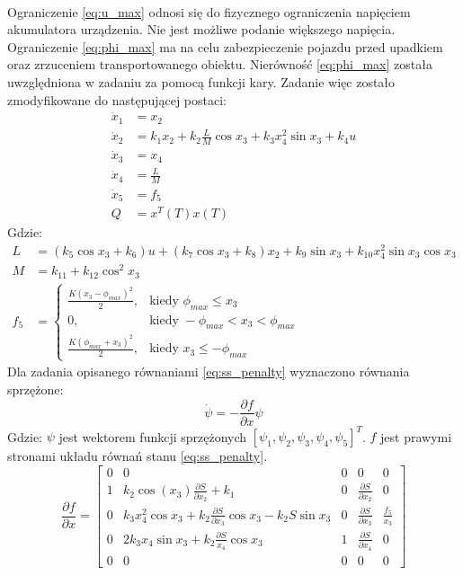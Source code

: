\paragraph*{}
Ograniczenie \eqref{eq:u_max} odnosi się do fizycznego ograniczenia napięciem akumulatora urządzenia. Nie jest możliwe podanie większego napięcia. Ograniczenie \eqref{eq:phi_max} ma na celu zabezpieczenie pojazdu przed upadkiem oraz zrzuceniem transportowanego obiektu. Nierówność \eqref{eq:phi_max} została uwzględniona w zadaniu za pomocą funkcji kary. Zadanie więc zostało zmodyfikowane do następującej postaci:
\begin{equation}
\begin{aligned}
\dot x_1 &=x_2\\
\dot x_2 &=k_1x_2+k_2\frac{L}{M}\cos x_3+k_3x_4^2\sin x_3+k_4u\\
\dot x_3 &=x_4\\
\dot x_4 &=\frac{L}{M}\\
\dot x_5 &=f_5\\
Q &=x^T(T)x(T)
\end{aligned}
\label{eq:ss_penalty}
\end{equation}
\noindent Gdzie:
\begin{equation}
\begin{aligned}
L &=(k_5\cos x_3+k_6)u+(k_7\cos x_3+k_8)x_2+k_9\sin x_3+k_{10}x_4^2\sin x_3\cos x_3\\
M &=k_{11}+k_{12}\cos ^2x_3\\
f_5 &=
	\begin{cases}
	\frac{K(x_3-\phi_{max})^2}{2}, & \text{kiedy } \phi_{max}\leqslant x_3\\
	0, & \text{kiedy } -\phi_{max}<x_3<\phi_{max}\\
	\frac{K(\phi_{max}+x_3)^2}{2}, & \text{kiedy } x_3\leqslant -\phi_{max}
	\end{cases}
\end{aligned}
\end{equation}
Dla zadania opisanego równaniami \eqref{eq:ss_penalty} wyznaczono równania sprzężone:
\begin{equation}
\dot \psi=-\frac{\partial f}{\partial x}\psi
\end{equation}
\noindent Gdzie:\newline
\(\psi\) jest wektorem funkcji sprzężonych \([\psi_1, \psi_2, \psi_3, \psi_4, \psi_5]^T\).\newline
\(f\) jest prawymi stronami układu równań stanu \eqref{eq:ss_penalty}.
\begin{equation}
\frac{\partial f}{\partial x}=\begin{bmatrix}
0 & 0 & 0 & 0 & 0\\
1 & k_2\cos(x_3)\frac{\partial S}{\partial x_2}+k_1 & 0 & \frac{\partial S}{\partial x_2} & 0\\
0 & k_3x_4^2\cos x_3+k_2\frac{\partial S}{\partial x_3}\cos x_3-k_2S\sin x_3 & 0 & \frac{\partial S}{\partial x_3} & \frac{f_5}{x_3}\\
0 & 2k_3x_4\sin x_3+k_2\frac{\partial S}{x_4}\cos x_3 & 1 & \frac{\partial S}{\partial x_4} & 0\\
0 & 0 & 0 & 0 & 0
\end{bmatrix}
\end{equation}
